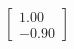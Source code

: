 \documentclass[preview]{standalone}
\begin{document}
\begin{align*}
\begin{bmatrix} 1.00 \\ -0.90 \end{bmatrix}
\end{align*}
\end{document}
